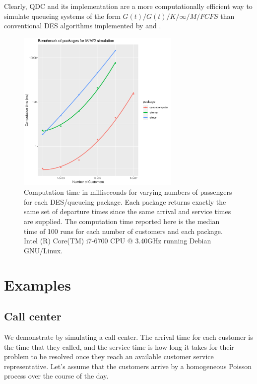 \documentclass[article]{jss}
\begin{document}
Clearly, QDC and its implementation  are a more computationally efficient way to simulate queueing systems of the form $G(t)/G(t)/K/\infty/M/FCFS$ than conventional DES algorithms implemented by  and . 

\begin{figure}[!htb]
  \centering
  \includegraphics[width = 0.7\textwidth]{figures/benchmark_083.pdf}
  \caption{Computation time in milliseconds for varying numbers of passengers for each DES/queueing package. Each package returns exactly the same set of departure times since the same arrival and service times are supplied. The computation time reported here is the median time of 100 runs for each number of customers and each package. Intel (R) Core(TM) i7-6700
CPU @ 3.40GHz running Debian GNU/Linux.
 }
  \label{fig:bm_numberofpassengers}
\end{figure}

\newpage

\section{Examples} \label{sec:Examples}

\subsection{Call center} \label{ssec:callcenter}

We demonstrate  by simulating a call center. The arrival time for each customer is the time that they called, and the service time is how long it takes for their problem to be resolved once they reach an available customer service representative. Let's assume that the customers arrive by a homogeneous Poisson process over the course of the day. 
\end{document}
